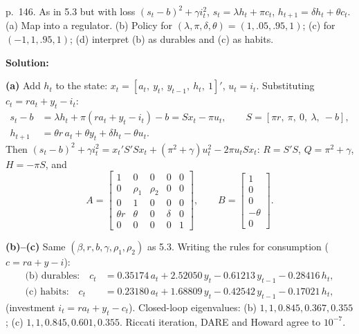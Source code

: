 \documentclass[12pt, letterpaper]{article}
\begin{document}
\begin{tcolorbox}[evenbox,title={Exercise 5.4 \quad Durable goods and habit persistence}]
\begin{tcolorbox}[questionbox]
p.~146. As in 5.3 but with loss $(s_t-b)^2+\gamma i_t^2$, $s_t=\lambda h_t+\pi c_t$,
$h_{t+1}=\delta h_t+\theta c_t$. (a) Map into a regulator. (b) Policy for
$(\lambda,\pi,\delta,\theta)=(1,.05,.95,1)$; (c) for $(-1,1,.95,1)$; (d) interpret (b) as durables
and (c) as habits.
\end{tcolorbox}

\textbf{Solution:}

\textbf{(a)} Add $h_t$ to the state: $x_t=[a_t,\ y_t,\ y_{t-1},\ h_t,\ 1]'$, $u_t=i_t$. Substituting
$c_t=ra_t+y_t-i_t$:
\begin{align*}
s_t-b&=\lambda h_t+\pi(ra_t+y_t-i_t)-b=Sx_t-\pi u_t,\qquad S=[\pi r,\ \pi,\ 0,\ \lambda,\ -b],\\
h_{t+1}&=\theta r\,a_t+\theta y_t+\delta h_t-\theta u_t .
\end{align*}
Then $(s_t-b)^2+\gamma i_t^2=x_t'S'Sx_t+(\pi^2+\gamma)u_t^2-2\pi u_tSx_t$: $R=S'S$,
$Q=\pi^2+\gamma$, $H=-\pi S$, and
\[
A=\begin{bmatrix}1&0&0&0&0\\0&\rho_1&\rho_2&0&0\\0&1&0&0&0\\\theta r&\theta&0&\delta&0\\0&0&0&0&1\end{bmatrix},\qquad
B=\begin{bmatrix}1\\0\\0\\-\theta\\0\end{bmatrix}.
\]

\textbf{(b)--(c)} Same $(\beta,r,b,\gamma,\rho_1,\rho_2)$ as 5.3. Writing the rules for
consumption ($c=ra+y-i$):
\begin{align*}
\text{(b) durables:}\quad c_t&=0.35174\,a_t+2.52050\,y_t-0.61213\,y_{t-1}-0.28416\,h_t,\\
\text{(c) habits:}\quad c_t&=0.23180\,a_t+1.68809\,y_t-0.42542\,y_{t-1}-0.17021\,h_t,
\end{align*}
(investment $i_t=ra_t+y_t-c_t$). Closed-loop eigenvalues: (b) $1,1,0.845,0.367,0.355$;
(c) $1,1,0.845,0.601,0.355$. Riccati iteration, DARE and Howard agree to $10^{-7}$.


\end{tcolorbox}
\end{document}
